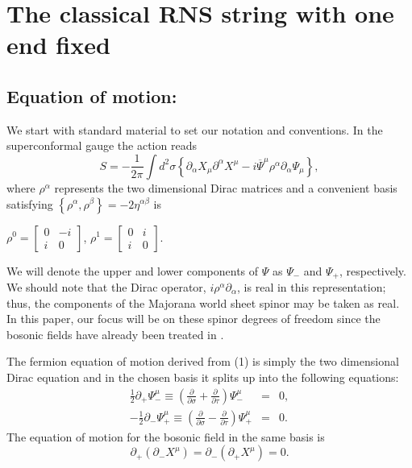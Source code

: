 \documentclass[a4paper,a4paper]{article}
\begin{document}
\section{The classical RNS string with one end fixed}
\subsection{Equation of motion:}

We start with standard material to set our notation and
conventions.  In the superconformal gauge the action reads
\begin{equation}
S=-\frac{1}{2\pi}\int
d^{2}\sigma\left\{\partial_{\alpha}X_{\mu}\partial^{\alpha}X^{\mu}-i\overline{\Psi}^{\mu}\rho^{\alpha}\partial_{\alpha}\Psi_{\mu}\right\},
\end{equation}
where $\rho^{\alpha}$ represents the two dimensional Dirac
matrices and a convenient basis satisfying
$\left\{\rho^{\alpha},\rho^{\beta}\right\}=-2\eta^{\alpha\beta}$
is
\begin{center}
$\rho^{0}=\left[
\begin{array}{cc}
0 & -i \\
i & 0%
\end{array}%
\right]$, $\rho^{1}=\left[
\begin{array}{cc}
0 & i \\
i & 0%
\end{array}%
\right]$.
\end{center}
We will denote the upper and lower components of $\Psi$ as
$\Psi_{-}$ and $\Psi_{+}$, respectively.  We should note that the
Dirac operator, $i\rho^{\alpha}\partial_{\alpha}$, is real in this
representation; thus, the components of the Majorana world sheet
spinor may be taken as real. In this paper, our focus will be on
these spinor degrees of freedom since the bosonic fields have
already been treated in \cite{Gursoy}.

The fermion equation of motion derived from (1) is simply the two
dimensional Dirac equation and in the chosen basis it splits up
into the following equations:
\begin{eqnarray}
\frac{ 1}{2}  \partial_{+}\Psi_{-}^{\mu}\equiv(\frac{\partial}{\partial\sigma}+\frac{\partial}{\partial\tau})\Psi_{-}^{\mu}&=&0,\\
-\frac{1}{2}
\partial_{-}\Psi_{+}^{\mu}\equiv(\frac{\partial}{\partial\sigma}-\frac{\partial}{\partial\tau})\Psi_{+}^{\mu}&=&0.
\end{eqnarray}
The equation of motion for the bosonic field in the same basis is
\begin{equation}
\partial_{+}(\partial_{-}X^{\mu})=\partial_{-}(\partial_{+}X^{\mu})=0.
\end{equation}
\end{document}
